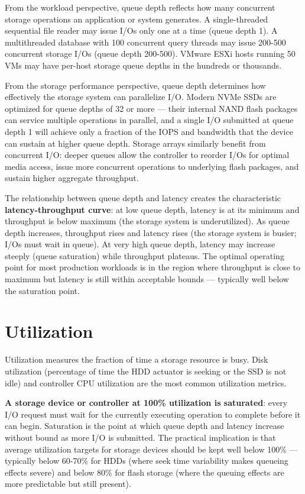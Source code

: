 From the workload perspective, queue depth reflects how many concurrent storage operations an application or system generates. A single-threaded sequential file reader may issue I/Os only one at a time (queue depth 1). A multithreaded database with 100 concurrent query threads may issue 200-500 concurrent storage I/Os (queue depth 200-500). VMware ESXi hosts running 50 VMs may have per-host storage queue depths in the hundreds or thousands.

From the storage performance perspective, queue depth determines how effectively the storage system can parallelize I/O. Modern NVMe SSDs are optimized for queue depths of 32 or more --- their internal NAND flash packages can service multiple operations in parallel, and a single I/O submitted at queue depth 1 will achieve only a fraction of the IOPS and bandwidth that the device can sustain at higher queue depth. Storage arrays similarly benefit from concurrent I/O: deeper queues allow the controller to reorder I/Os for optimal media access, issue more concurrent operations to underlying flash packages, and sustain higher aggregate throughput.

The relationship between queue depth and latency creates the characteristic \textbf{latency-throughput curve}: at low queue depth, latency is at its minimum and throughput is below maximum (the storage system is underutilized). As queue depth increases, throughput rises and latency rises (the storage system is busier; I/Os must wait in queue). At very high queue depth, latency may increase steeply (queue saturation) while throughput plateaus. The optimal operating point for most production workloads is in the region where throughput is close to maximum but latency is still within acceptable bounds --- typically well below the saturation point.

\section{Utilization}
Utilization measures the fraction of time a storage resource is busy. Disk utilization (percentage of time the HDD actuator is seeking or the SSD is not idle) and controller CPU utilization are the most common utilization metrics.

\textbf{A storage device or controller at 100\% utilization is saturated}: every I/O request must wait for the currently executing operation to complete before it can begin. Saturation is the point at which queue depth and latency increase without bound as more I/O is submitted. The practical implication is that average utilization targets for storage devices should be kept well below 100\% --- typically below 60-70\% for HDDs (where seek time variability makes queueing effects severe) and below 80\% for flash storage (where the queuing effects are more predictable but still present).

